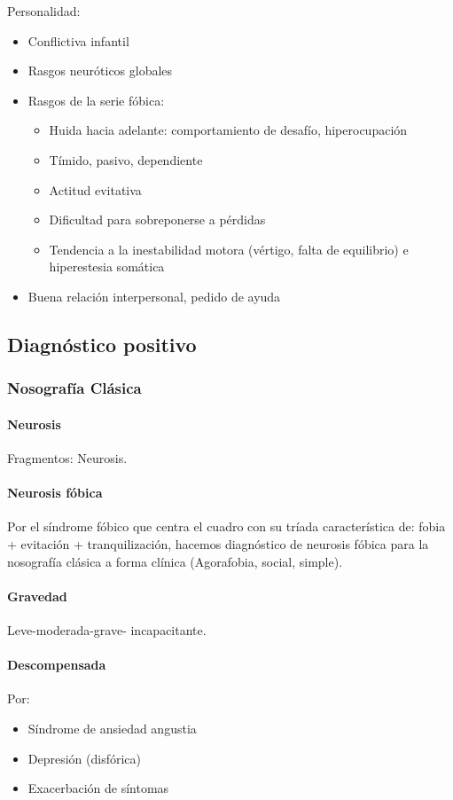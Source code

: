 \documentclass{scrbook}
\begin{document}
Personalidad:
\begin{itemize}
	\item Conflictiva infantil
	\item Rasgos neuróticos globales
	\item Rasgos de la serie fóbica:
	\begin{itemize}
		\item Huida hacia adelante: comportamiento de desafío, hiperocupación
		\item Tímido, pasivo, dependiente
		\item Actitud evitativa
		\item Dificultad para sobreponerse a pérdidas
		\item Tendencia a la inestabilidad motora (vértigo, falta de equilibrio) e hiperestesia somática
	\end{itemize}
	\item Buena relación interpersonal, pedido de ayuda
\end{itemize}
\subsection{Diagnóstico positivo}
\subsubsection*{Nosografía Clásica}
\paragraph{Neurosis}
\faPaste Fragmentos: Neurosis.
\paragraph{Neurosis fóbica}
Por el síndrome fóbico que centra el cuadro con su tríada característica de: fobia + evitación + tranquilización, hacemos diagnóstico de neurosis fóbica para la nosografía clásica a forma clínica (Agorafobia, social, simple).
\paragraph{Gravedad}
Leve-moderada-grave- incapacitante.
\paragraph{Descompensada}
Por:
\begin{itemize}
	\item Síndrome de ansiedad angustia
	\item Depresión (disfórica)
	\item Exacerbación de síntomas
\end{itemize}
\end{document}
